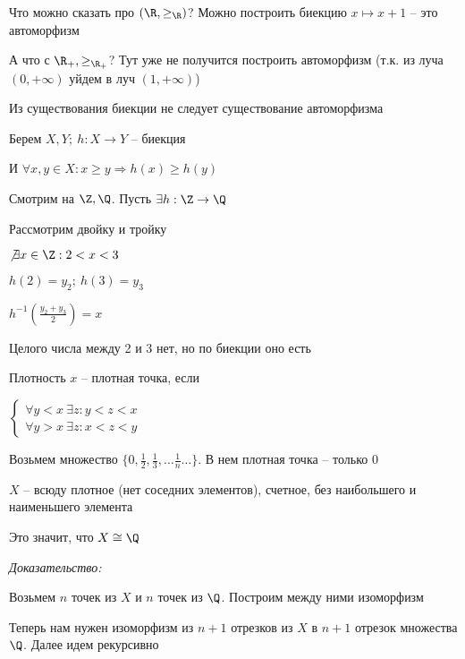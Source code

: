 \documentclass[12pt]{article}
\begin{document}
Что можно сказать про $(\R, \geq_\R)$? Можно построить биекцию $x \mapsto x + 1$ -- это автоморфизм

А что с $\R_+, \geq_{\R_+}$? Тут уже не получится построить автоморфизм (т.к. из луча $(0, +\infty)$ уйдем в луч $(1, +\infty)$)

\begin{Remark}{}
    Из существования биекции не следует существование автоморфизма

    Берем $X, Y;\ h : X \to Y$ -- биекция

    И $\forall x, y \in X : x \geq y \Rightarrow h(x) \geq h(y)$

    Смотрим на $\Z, \Q$. Пусть $\exists h : \Z \to \Q$ 

    Рассмотрим двойку и тройку

    $\not\exists x \in \Z : 2 < x < 3$

    $h(2) = y_2;\ h(3) = y_3$

    $h^{-1}(\frac{y_2 + y_3}{2}) = x$

    Целого числа между 2 и 3 нет, но по биекции оно есть
\end{Remark}

\begin{defin}{Плотность}
    $x$ -- плотная точка, если

    $\begin{cases}
        \forall y < x\ \exists z : y < z < x \\
        \forall y > x\ \exists z : x < z < y
    \end{cases}$
\end{defin}

\begin{Example}{}
    Возьмем множество $\{0, \frac{1}{2}, \frac{1}{3}, \ldots \frac{1}{n} \ldots\}$. В нем плотная точка -- только 0
\end{Example}

\begin{theo}{}
    $X$ -- всюду плотное (нет соседних элементов), счетное, без наибольшего и наименьшего элемента

    Это значит, что $X \cong \Q$
\end{theo}

\textit{Доказательство:}

Возьмем $n$ точек из $X$ и $n$ точек из $\Q$. Построим между ними изоморфизм

Теперь нам нужен изоморфизм из $n + 1$ отрезков из $X$ в $n + 1$ отрезок множества $\Q$. Далее идем рекурсивно
\end{document}
